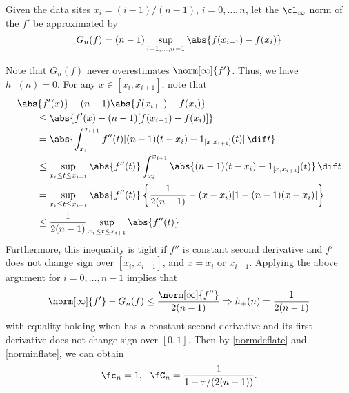 

Given the data sites $x_i=(i-1)/(n-1)$, $i=0, \ldots, n$, let the $\cl_\infty$ norm of the $f'$ be approximated by
\begin{equation}\label{estfirstderiv}
G_n(f) = (n-1) \sup_{i=1, \ldots, n-1} \abs{f(x_{i+1})-f(x_i)}
\end{equation}

Note that $G_n(f)$ never overestimates $\norm[\infty]{f'}$. Thus, we have
$h_{-}(n)=0.$
For any $x \in [x_{i}, x_{i+1}]$, note that
\begin{align*}
\MoveEqLeft{\abs{f'(x)} - (n-1) \abs{f(x_{i+1})-f(x_i)}} \\
 & \le \abs{f'(x) - (n-1)[f(x_{i+1})-f(x_i)]} \\
&=\abs{ \int_{x_i}^{x_{i+1}} f''(t) [(n-1)(t-x_i) -  1_{[x,x_{i+1}]}(t)] \, \dif t} \\
& \le \sup_{x_i \le t \le x_{i+1}} \abs{f''(t)} \int_{x_i}^{x_{i+1}} \abs{  (n-1)(t-x_i) -  1_{[x,x_{i+1}]}(t)} \, \dif t \\
&=\sup_{x_i \le t \le x_{i+1}} \abs{f''(t)} \left \{\frac{1}{2(n-1)} - (x-x_i)[1-(n-1)(x-x_i)] \right\} \\
&\le \frac{1}{2(n-1)}\sup_{x_i \le t \le x_{i+1}} \abs{f''(t)}
\end{align*}
Furthermore, this inequality is tight if $f''$ is constant second derivative and $f'$ does not change sign over $[x_{i}, x_{i+1}]$, and $x=x_i$ or $x_{i+1}$.  Applying the above argument for $i=0, \ldots, n-1$ implies that
\[
\norm[\infty]{f'} - G_n(f) \le \frac{\norm[\infty]{f''}}{2(n-1)} \Rightarrow h_{+}(n)=\frac{1}{2(n-1)}
\]
with equality holding when has a constant second derivative and its first derivative does not change sign over $[0,1]$.
Then by \eqref{normdeflate} and \eqref{norminflate}, we can obtain
\begin{equation}\label{inflaapprox}
\fc_n=1, \ \   \fC_n =\frac{1}{1 - \tau /(2(n-1))}.
\end{equation}

